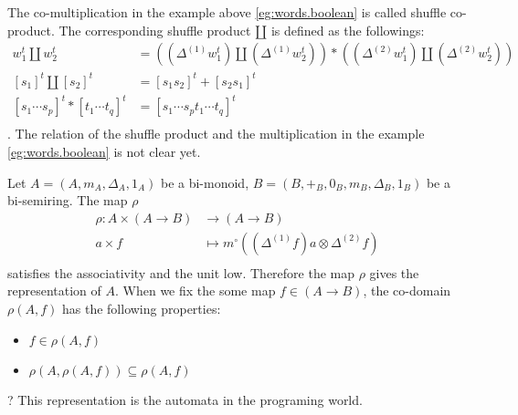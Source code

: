 \begin{observe}
The co-multiplication in the example above \ref{eg:words.boolean} is
called shuffle co-product. The corresponding shuffle product $\amalg$
is defined as the followings:
\begin{equation}\begin{split}
	w_1^t \amalg w_2^t &= ((\Delta^{(1)}w_1^t) \amalg (\Delta^{(1)}w_2^t)) * ((\Delta^{(2)}w_1^t) \amalg (\Delta^{(2)}w_2^t)) \\
	[s_1]^t \amalg [s_2]^t &= [s_1s_2]^t + [s_2s_1]^t \\
	[s_1 \cdots s_p]^t * [t_1 \cdots t_q]^t &= [s_1 \cdots s_p t_1 \cdots t_q]^t \\
\end{split}\end{equation}
. The relation of the shuffle product and the multiplication in the
example \ref{eg:words.boolean} is not clear yet.
\end{observe}

\begin{todo}
Let $A=(A,m_A,\Delta_A,1_A)$ be a bi-monoid,
$B=(B,+_B,0_B,m_B,\Delta_B,1_B)$ be a bi-semiring.
The map $\rho$
\begin{equation}\begin{split}
	\rho: A \times (A \to B) &\to (A \to B) \\
		a \times f &\mapsto m^\circ((\Delta^{(1)}f)a \otimes \Delta^{(2)}f) \\
\end{split}\end{equation}
satisfies the associativity and the unit low.
Therefore the map $\rho$ gives the representation of $A$. 
When we fix the some map $f\in (A\to B)$, the co-domain $\rho(A, f)$
has the following properties:
\begin{itemize}
	\item $f\in \rho(A, f)$
	\item $\rho(A, \rho(A, f)) \subseteq \rho(A, f)$
\end{itemize}
?
This representation is the automata in the programing world.
\end{todo}

